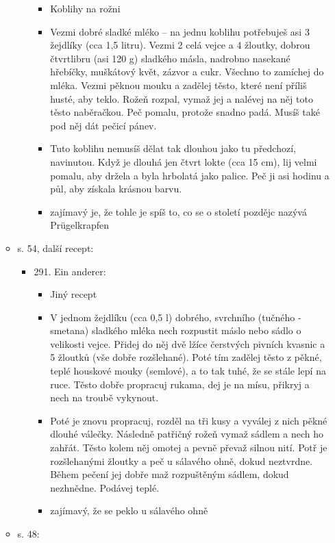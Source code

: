 \begin{itemize}
\begin{itemize}
\begin{itemize}
      \begin{itemize}
      \tightlist
      \item
        Koblihy na rožni
      \item
        Vezmi dobré sladké mléko -- na jednu koblihu potřebuješ asi 3
        žejdlíky (cca 1,5 litru). Vezmi 2 celá vejce a 4 žloutky, dobrou
        čtvrtlibru (asi 120 g) sladkého másla, nadrobno nasekané
        hřebíčky, muškátový květ, zázvor a cukr. Všechno to zamíchej do
        mléka. Vezmi pěknou mouku a zadělej těsto, které není příliš
        husté, aby teklo. Rožeň rozpal, vymaž jej a nalévej na něj toto
        těsto naběračkou. Peč pomalu, protože snadno padá. Musíš také
        pod něj dát pečicí pánev.
      \item
        Tuto koblihu nemusíš dělat tak dlouhou jako tu předchozí,
        navinutou. Když je dlouhá jen čtvrt lokte (cca 15 cm), lij velmi
        pomalu, aby držela a byla hrbolatá jako palice. Peč ji asi
        hodinu a půl, aby získala krásnou barvu.
      \item
        zajímavý je, že tohle je spíš to, co se o století pozdějc nazývá
        Prügelkrapfen
      \end{itemize}
    \end{itemize}
  \item
    s. 54, další recept:

    \begin{itemize}
    \tightlist
    \item
      291. Ein anderer:

      \begin{itemize}
      \tightlist
      \item
        Jiný recept
      \item
        V jednom žejdlíku (cca 0,5 l) dobrého, svrchního (tučného -
        smetana) sladkého mléka nech rozpustit máslo nebo sádlo o
        velikosti vejce. Přidej do něj dvě lžíce čerstvých pivních
        kvasnic a 5 žloutků (vše dobře rozšlehané). Poté tím zadělej
        těsto z pěkné, teplé houskové mouky (semlové), a to tak tuhé, že
        se stále lepí na ruce. Těsto dobře propracuj rukama, dej je na
        mísu, přikryj a nech na troubě vykynout.
      \item
        Poté je znovu propracuj, rozděl na tři kusy a vyválej z nich
        pěkné dlouhé válečky. Následně patřičný rožeň vymaž sádlem a
        nech ho zahřát. Těsto kolem něj omotej a pevně převaž silnou
        nití. Potř je rozšlehanými žloutky a peč u sálavého ohně, dokud
        neztvrdne. Během pečení jej dobře maž rozpuštěným sádlem, dokud
        nezhnědne. Podávej teplé.
      \item
        zajímavý, že se peklo u sálavého ohně
      \end{itemize}
    \end{itemize}
  \item
    s. 48:


\end{itemize}
\end{itemize}
